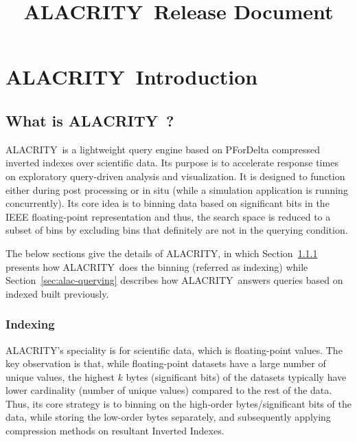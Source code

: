 \documentclass[11pt,a4paper]{article}
\newcommand{\alac}{ALACRITY}
\begin{document}
\title{\alac\ Release Document}
\maketitle

\section{ \alac\ Introduction}

\subsection{What is \alac\ ?}


\alac\ is a lightweight query engine based on PForDelta compressed inverted indexes over scientific data. 
Its purpose is to accelerate response times on exploratory query-driven analysis and visualization. 
It is designed to function either during post processing or in situ (while a simulation application is running concurrently). 
Its core idea is to binning data based on significant bits in the IEEE floating-point representation and thus, the search space is reduced to a subset of bins by excluding bins that definitely are not in the querying condition.

The below sections give the details of \alac, in which Section~\ref{sec:alac-indexing} presents how \alac\ does the binning (referred as indexing) while Section~\ref{sec:alac-querying} describes how \alac\ answers queries based on indexed built previously.

\subsubsection{Indexing} 
\label{sec:alac-indexing}

\alac's speciality is for scientific data, which is floating-point values. 
The key observation is that, while floating-point datasets have a large number
of unique values, the highest $k$ bytes (significant bits) of the datasets typically have lower
cardinality (number of unique values) compared to the rest of the data.  
Thus, its core strategy is to binning on the high-order bytes/significant bits of the data, while storing the low-order bytes separately, and subsequently applying compression methods on resultant Inverted Indexes. 
\end{document}
